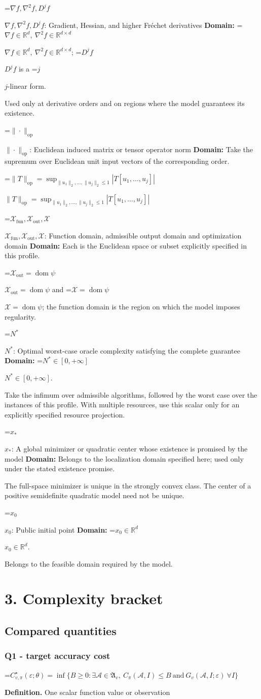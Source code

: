 \documentclass[10pt,a4paper]{article}
\newcommand{\AtlasMath}[1]{\par\begingroup\centering\setbox0=\hbox{$\displaystyle #1$}\ifdim\wd0>1.4\linewidth\typeout{ATLAS WIDE FORMULA: \the\wd0}\fi\ifdim\wd0>\linewidth\resizebox{\linewidth}{!}{\box0}\else\box0\fi\par\endgroup}
\newcommand{\AtlasInlineMath}[1]{\begingroup\setbox0=\hbox{$#1$}\ifdim\wd0>.4\linewidth\endgroup\AtlasMath{#1}\else\endgroup$#1$\fi}
\begin{document}
\AtlasInlineMath{\nabla f,\nabla^2f,D^jf}: Gradient, Hessian, and higher Fréchet derivatives \textbf{Domain:} \AtlasInlineMath{\nabla f\in\mathbb{R}^d,\ \nabla^2f\in\mathbb{R}^{d\times d}}; \AtlasInlineMath{D^jf} is a \AtlasInlineMath{j}-linear form.

Used only at derivative orders and on regions where the model guarantees its existence.

\AtlasInlineMath{\|\cdot\|_{\mathrm{op}}}: Euclidean induced matrix or tensor operator norm \textbf{Domain:} Take the supremum over Euclidean unit input vectors of the corresponding order.

\AtlasInlineMath{\|T\|_{\mathrm{op}}=\sup_{\|u_1\|_2,\ldots,\|u_j\|_2\le1}|T[u_1,\ldots,u_j]|}

\AtlasInlineMath{\mathcal{X}_{\mathrm{fun}},\mathcal{X}_{\mathrm{out}},\mathcal{X}}: Function domain, admissible output domain and optimization domain \textbf{Domain:} Each is the Euclidean space or subset explicitly specified in this profile.

\AtlasInlineMath{\mathcal{X}_{\mathrm{out}}=\operatorname{dom}\psi} and \AtlasInlineMath{\mathcal{X}=\operatorname{dom}\psi}; the function domain is the region on which the model imposes regularity.

\AtlasInlineMath{N^*}: Optimal worst-case oracle complexity satisfying the complete guarantee \textbf{Domain:} \AtlasInlineMath{N^*\in[0,+\infty]}.

Take the infimum over admissible algorithms, followed by the worst case over the instances of this profile. With multiple resources, use this scalar only for an explicitly specified resource projection.

\AtlasInlineMath{x_*}: A global minimizer or quadratic center whose existence is promised by the model \textbf{Domain:} Belongs to the localization domain specified here; used only under the stated existence promise.

The full-space minimizer is unique in the strongly convex class. The center of a positive semidefinite quadratic model need not be unique.

\AtlasInlineMath{x_0}: Public initial point \textbf{Domain:} \AtlasInlineMath{x_0\in\mathbb{R}^d}.

Belongs to the feasible domain required by the model.

\section{3. Complexity bracket}
\subsection{Compared quantities}
\subsubsection{Q1 - target accuracy cost}
\AtlasMath{C^\star_{v,\pi}(\varepsilon;\theta)=\inf\{B\ge0:\exists\mathcal A\in\mathfrak A_v,\ C_\pi(\mathcal A,I)\le B\ \text{and}\ G_v(\mathcal A,I;\varepsilon)\ \forall I\}}
\textbf{Definition.} One scalar function value or observation
\end{document}
